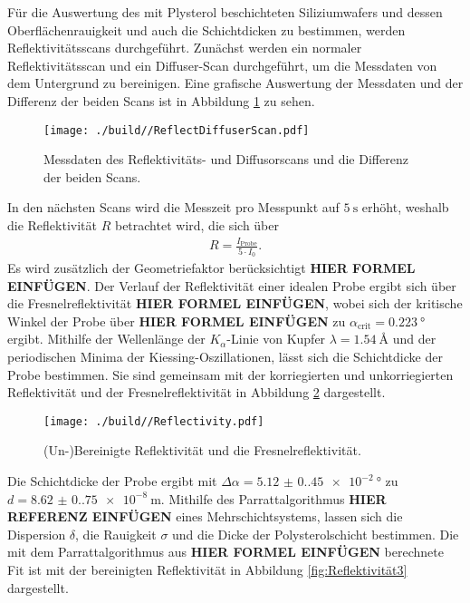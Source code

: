 Für die Auswertung des mit Plysterol beschichteten Siliziumwafers und dessen Oberflächenrauigkeit und auch die Schichtdicken zu bestimmen, werden Reflektivitätsscans durchgeführt.
Zunächst werden ein normaler Reflektivitätsscan und ein Diffuser-Scan durchgeführt, um die Messdaten von dem Untergrund zu bereinigen.
Eine grafische Auswertung der Messdaten und der Differenz der beiden Scans ist in Abbildung \ref{fig:Reflektivität} zu sehen.
\begin{figure}[H]
    \centering
    \texttt{[image: ./build//ReflectDiffuserScan.pdf]}
    \caption{Messdaten des Reflektivitäts- und Diffusorscans und die Differenz der beiden Scans.}
    \label{fig:Reflektivität}
\end{figure}
\noindent
In den nächsten Scans wird die Messzeit pro Messpunkt auf $\SI{5}{\second}$ erhöht, weshalb die Reflektivität $R$ betrachtet wird, die sich über
\begin{align*}
    R = \frac{I_{\text{Probe}}}{5\cdot I_{0}}.
\end{align*}
Es wird zusätzlich der Geometriefaktor berücksichtigt \textbf{HIER FORMEL EINFÜGEN}.
Der Verlauf der Reflektivität einer idealen Probe ergibt sich über die Fresnelreflektivität \textbf{HIER FORMEL EINFÜGEN}, wobei sich der kritische Winkel der Probe über \textbf{HIER FORMEL EINFÜGEN} zu $\alpha_{\text{crit}} = \SI{0.223}{\degree}$ ergibt.
Mithilfe der Wellenlänge der $K_{\alpha}$-Linie von Kupfer $\lambda = \SI{1.54}{\angstrom}$ und der periodischen Minima der Kiessing-Oszillationen, lässt sich die Schichtdicke der Probe bestimmen.
Sie sind gemeinsam mit der korriegierten und unkorriegierten Reflektivität und der Fresnelreflektivität in Abbildung \ref{fig:Reflektivität2} dargestellt.
\begin{figure}[H]
    \centering
    \texttt{[image: ./build//Reflectivity.pdf]}
    \caption{(Un-)Bereinigte Reflektivität und die Fresnelreflektivität.}
    \label{fig:Reflektivität2}
\end{figure}
\noindent
Die Schichtdicke der Probe ergibt mit $\Delta\alpha= \SI{5.12(0.45)e-2}{\degree}$ zu $d = \SI{8.62(0.75)e-8}{\meter}$. \newline
Mithilfe des Parrattalgorithmus \textbf{HIER REFERENZ EINFÜGEN} eines Mehrschichtsystems, lassen sich die Dispersion $\delta$, die Rauigkeit $\sigma$ und die Dicke der Polysterolschicht bestimmen.
Die mit dem Parrattalgorithmus aus \textbf{HIER FORMEL EINFÜGEN} berechnete Fit ist mit der bereinigten Reflektivität in Abbildung \ref{fig:Reflektivität3} dargestellt.
